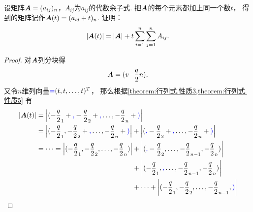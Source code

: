 \begin{example}
设矩阵\(\A = (a_{ij})_n\)，\(A_{ij}\)为\(a_{ij}\)的代数余子式.
把\(\A\)的每个元素都加上同一个数\(t\)，
得到的矩阵记作\(\A(t) = (a_{ij} + t)_n\).
证明：\[
	\abs{\A(t)}
	= \abs{\A} + t \sum\limits_{i=1}^n \sum\limits_{j=1}^n A_{ij}.
\]
\begin{proof}
对\(\A\)列分块得\[
	\A = (\v{\a}{n}),
\]
又令\(n\)维列向量\(\b=(t,t,\dotsc,t)^T\)，
那么根据\cref{theorem:行列式.性质3,theorem:行列式.性质5} 有
\begin{align*}
	\abs{\A(t)}
	&= \abs{(\a_1+\b,\a_2+\b,\dotsc,\a_n+\b)} \\
	&= \abs{(\a_1,\a_2+\b,\dotsc,\a_n+\b)}
		+ \abs{(\b,\a_2+\b,\dotsc,\a_n+\b)} \\
	&= \dotsb = \abs{(\a_1,\a_2,\dotsc,\a_n)}
		\begin{aligned}[t]
			&+ \abs{(\b,\a_2,\dotsc,\a_{n-1},\a_n)} \\
			&+ \abs{(\a_1,\b,\dotsc,\a_{n-1},\a_n)} \\
			&+ \dotsb
			+ \abs{(\a_1,\a_2,\dotsc,\a_{n-1},\b)}
		\end{aligned}
\end{align*}

\end{proof}
\end{example}
